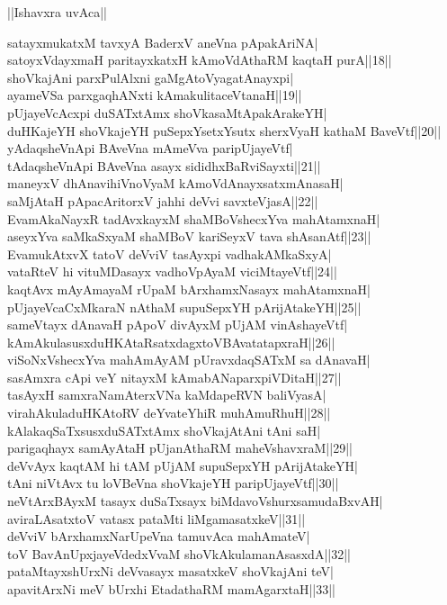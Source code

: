 \documentclass{article}
\begin{document}
\begin{center}
||Ishavxra uvAca||
\end{center}

satayxmukatxM tavxyA BaderxV aneVna pApakAriNA|\\
satoyxVdayxmaH paritayxkatxH kAmoVdAthaRM kaqtaH purA||18||\\
shoVkajAni parxPulAlxni gaMgAtoVyagatAnayxpi|\\
ayameVSa parxgaqhANxti kAmakulitaceVtanaH||19||\\
pUjayeVcAcxpi duSATxtAmx shoVkasaMtApakArakeYH|\\
duHKajeYH shoVkajeYH puSepxYsetxYsutx sherxVyaH kathaM BaveVtf||20||\\
yAdaqsheVnApi BAveVna mAmeVva paripUjayeVtf|\\
tAdaqsheVnApi BAveVna asayx sididhxBaRviSayxti||21||\\
maneyxV dhAnavihiVnoVyaM kAmoVdAnayxsatxmAnasaH|\\
saMjAtaH pApacAritorxV jahhi deVvi savxteVjasA||22||\\
EvamAkaNayxR tadAvxkayxM shaMBoVshecxYva mahAtamxnaH|\\
aseyxYva saMkaSxyaM shaMBoV kariSeyxV tava shAsanAtf||23||\\
EvamukAtxvX tatoV deVviV tasAyxpi vadhakAMkaSxyA|\\
vataRteV hi vituMDasayx vadhoVpAyaM viciMtayeVtf||24||\\
kaqtAvx mAyAmayaM rUpaM bArxhamxNasayx mahAtamxnaH|\\
pUjayeVcaCxMkaraN nAthaM supuSepxYH pArijAtakeYH||25||\\
sameVtayx dAnavaH pApoV divAyxM pUjAM vinAshayeVtf|\\
kAmAkulasusxduHKAtaRsatxdagxtoVBAvatatapxraH||26||\\
viSoNxVshecxYva mahAmAyAM pUravxdaqSATxM sa dAnavaH|\\
sasAmxra cApi veY nitayxM kAmabANaparxpiVDitaH||27||\\
tasAyxH samxraNamAterxVNa kaMdapeRVN baliVyasA|\\
virahAkuladuHKAtoRV deYvateYhiR muhAmuRhuH||28||\\
kAlakaqSaTxsusxduSATxtAmx shoVkajAtAni tAni saH|\\
parigaqhayx samAyAtaH pUjanAthaRM maheVshavxraM||29||\\
deVvAyx kaqtAM hi tAM pUjAM supuSepxYH pArijAtakeYH|\\
tAni niVtAvx tu loVBeVna shoVkajeYH paripUjayeVtf||30||\\
neVtArxBAyxM tasayx duSaTxsayx biMdavoVshurxsamudaBxvAH|\\
aviraLAsatxtoV vatasx pataMti liMgamasatxkeV||31||\\
deVviV bArxhamxNarUpeVna tamuvAca mahAmateV|\\
toV BavAnUpxjayeVdedxVvaM shoVkAkulamanAsasxdA||32||\\
pataMtayxshUrxNi deVvasayx masatxkeV shoVkajAni teV|\\
apavitArxNi meV bUrxhi EtadathaRM mamAgarxtaH||33||\\
\end{document}

